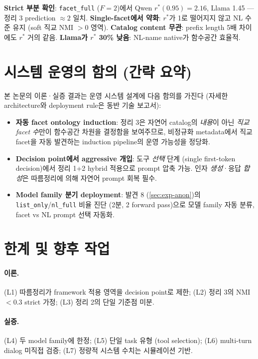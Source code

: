 \documentclass[11pt]{article}
\theoremstyle{definition}
\begin{document}
\textbf{Strict 부분 확인}: \texttt{facet\_full} ($F=2$)에서 Qwen $r^*(0.95) = 2.16$, Llama 1.45 — 정리 3 prediction $\approx 2$ 일치. \textbf{Single-facet에서 약화}: $r^*$가 1로 떨어지지 않고 NL 수준 유지 (soft 직교 NMI $> 0$ 영역). \textbf{Catalog content 무관}: prefix length 5배 차이에도 $r^*$ 거의 같음. \textbf{Llama가 $r^*$ 30\% 낮음}: NL-name native가 함수공간 효율적.

\section{시스템 운영의 함의 (간략 요약)}
\label{sec:system-summary}

본 논문의 이론·실증 결과는 운영 시스템 설계에 다음 함의를 가진다 (자세한 architecture와 deployment rule은 동반 기술 보고서):

\begin{itemize}[leftmargin=*]
\item \textbf{자동 facet ontology induction}: 정리 3은 자연어 catalog의 \emph{내용}이 아닌 \emph{직교 facet 수}만이 함수공간 차원을 결정함을 보여주므로, 비정규화 metadata에서 직교 facet을 자동 발견하는 induction pipeline의 운영 가능성을 정당화.
\item \textbf{Decision point에서 aggressive 개입}: 도구 \emph{선택} 단계 (single first-token decision)에서 정리 1+2 hybrid 적용으로 prompt 압축 가능. 인자 \emph{생성}·응답 \emph{합성}은 따름정리에 의해 자연어 prompt 회복 필수.
\item \textbf{Model family 분기 deployment}: 발견 8 (\cref{sec:exp-anon})의 \texttt{list\_only}/\texttt{nl\_full} 비율 진단 (2분, 2 forward pass)으로 모델 family 자동 분류, facet vs NL prompt 선택 자동화.
\end{itemize}

\section{한계 및 향후 작업}
\label{sec:limits}

\paragraph{이론.} (L1) 따름정리가 framework 적용 영역을 decision point로 제한; (L2) 정리 3의 NMI $< 0.3$ strict 가정; (L3) 정리 2의 단일 기준점 미분.
\paragraph{실증.} (L4) 두 model family에 한정; (L5) 단일 task 유형 (tool selection); (L6) multi-turn dialog 미직접 검증; (L7) 정량적 시스템 수치는 시뮬레이션 기반.
\end{document}
